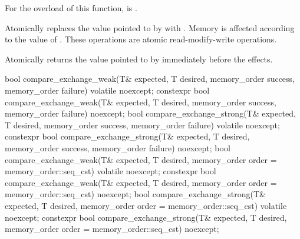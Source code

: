 \begin{itemdescr}
\pnum
\constraints
For the  overload of this function,
 is .

\pnum
\effects
Atomically replaces the value pointed to by 
with .
Memory is affected according to the value of .
These operations are atomic read-modify-write operations.

\pnum
\returns
Atomically returns the value pointed to by  immediately before the effects.
\end{itemdescr}

%
%
%
%
%
%
%
%
%
%
%
%
\begin{itemdecl}
bool compare_exchange_weak(T& expected, T desired,
                           memory_order success, memory_order failure) volatile noexcept;
constexpr bool compare_exchange_weak(T& expected, T desired,
                                     memory_order success, memory_order failure) noexcept;
bool compare_exchange_strong(T& expected, T desired,
                             memory_order success, memory_order failure) volatile noexcept;
constexpr bool compare_exchange_strong(T& expected, T desired,
                                       memory_order success, memory_order failure) noexcept;
bool compare_exchange_weak(T& expected, T desired,
                           memory_order order = memory_order::seq_cst) volatile noexcept;
constexpr bool compare_exchange_weak(T& expected, T desired,
                                     memory_order order = memory_order::seq_cst) noexcept;
bool compare_exchange_strong(T& expected, T desired,
                             memory_order order = memory_order::seq_cst) volatile noexcept;
constexpr bool compare_exchange_strong(T& expected, T desired,
                                       memory_order order = memory_order::seq_cst) noexcept;
\end{itemdecl}

